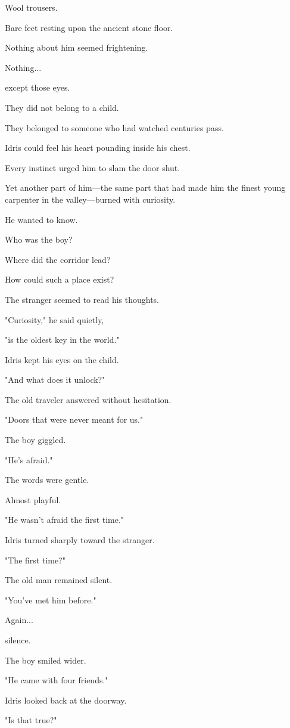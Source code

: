 \documentclass[12pt,openany]{book}
\begin{document}
Wool trousers.

Bare feet resting upon the ancient stone floor.

Nothing about him seemed frightening.

Nothing...

except those eyes.

They did not belong to a child.

They belonged to someone who had watched centuries pass.

Idris could feel his heart pounding inside his chest.

Every instinct urged him to slam the door shut.

Yet another part of him—the same part that had made him the finest young carpenter in the valley—burned with curiosity.

He wanted to know.

Who was the boy?

Where did the corridor lead?

How could such a place exist?

The stranger seemed to read his thoughts.

"Curiosity," he said quietly,

"is the oldest key in the world."

Idris kept his eyes on the child.

"And what does it unlock?"

The old traveler answered without hesitation.

"Doors that were never meant for us."

The boy giggled.

"He's afraid."

The words were gentle.

Almost playful.

"He wasn't afraid the first time."

Idris turned sharply toward the stranger.

"The first time?"

The old man remained silent.

"You've met him before."

Again...

silence.

The boy smiled wider.

"He came with four friends."

Idris looked back at the doorway.

"Is that true?"
\end{document}
